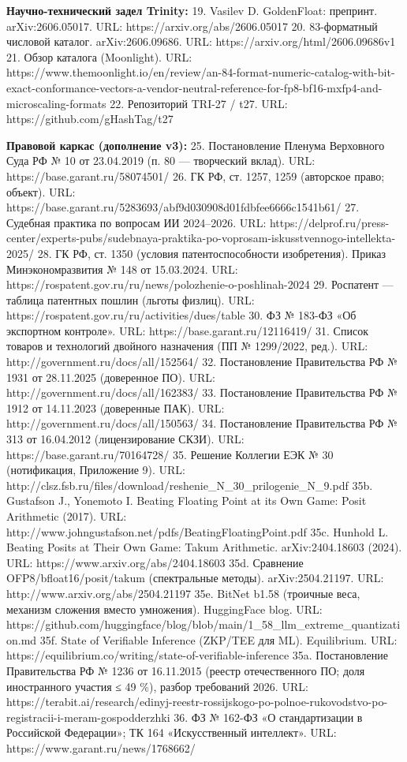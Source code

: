 \documentclass[
  russian,
]{article}
\begin{document}
\textbf{Научно-технический задел Trinity:} 19. Vasilev D. GoldenFloat:
препринт. arXiv:2606.05017. URL: https://arxiv.org/abs/2606.05017 20.
83-форматный числовой каталог. arXiv:2606.09686. URL:
https://arxiv.org/html/2606.09686v1 21. Обзор каталога (Moonlight). URL:
https://www.themoonlight.io/en/review/an-84-format-numeric-catalog-with-bit-exact-conformance-vectors-a-vendor-neutral-reference-for-fp8-bf16-mxfp4-and-microscaling-formats
22. Репозиторий TRI-27 / t27. URL: https://github.com/gHashTag/t27

\textbf{Правовой каркас (дополнение v3):} 25. Постановление Пленума
Верховного Суда РФ № 10 от 23.04.2019 (п. 80 --- творческий вклад). URL:
https://base.garant.ru/58074501/ 26. ГК РФ, ст. 1257, 1259 (авторское
право; объект). URL:
https://base.garant.ru/5283693/abf9d030908d01fdbfee6666c1541b61/ 27.
Судебная практика по вопросам ИИ 2024--2026. URL:
https://delprof.ru/press-center/experts-pubs/sudebnaya-praktika-po-voprosam-iskusstvennogo-intellekta-2025/
28. ГК РФ, ст. 1350 (условия патентоспособности изобретения). Приказ
Минэкономразвития № 148 от 15.03.2024. URL:
https://rospatent.gov.ru/ru/news/polozhenie-o-poshlinah-2024 29.
Роспатент --- таблица патентных пошлин (льготы физлиц). URL:
https://rospatent.gov.ru/ru/activities/dues/table 30. ФЗ № 183-ФЗ «Об
экспортном контроле». URL: https://base.garant.ru/12116419/ 31. Список
товаров и технологий двойного назначения (ПП № 1299/2022, ред.). URL:
http://government.ru/docs/all/152564/ 32. Постановление Правительства РФ
№ 1931 от 28.11.2025 (доверенное ПО). URL:
http://government.ru/docs/all/162383/ 33. Постановление Правительства РФ
№ 1912 от 14.11.2023 (доверенные ПАК). URL:
http://government.ru/docs/all/150563/ 34. Постановление Правительства РФ
№ 313 от 16.04.2012 (лицензирование СКЗИ). URL:
https://base.garant.ru/70164728/ 35. Решение Коллегии ЕЭК № 30
(нотификация, Приложение 9). URL:
http://clsz.fsb.ru/files/download/reshenie\_N\_30\_prilogenie\_N\_9.pdf
35b. Gustafson J., Yonemoto I. Beating Floating Point at its Own Game:
Posit Arithmetic (2017). URL:
http://www.johngustafson.net/pdfs/BeatingFloatingPoint.pdf 35c. Hunhold
L. Beating Posits at Their Own Game: Takum Arithmetic. arXiv:2404.18603
(2024). URL: https://www.arxiv.org/abs/2404.18603 35d. Сравнение
OFP8/bfloat16/posit/takum (спектральные методы). arXiv:2504.21197. URL:
http://www.arxiv.org/abs/2504.21197 35e. BitNet b1.58 (троичные веса,
механизм сложения вместо умножения). HuggingFace blog. URL:
https://github.com/huggingface/blog/blob/main/1\_58\_llm\_extreme\_quantization.md
35f. State of Verifiable Inference (ZKP/TEE для ML). Equilibrium. URL:
https://equilibrium.co/writing/state-of-verifiable-inference 35a.
Постановление Правительства РФ № 1236 от 16.11.2015 (реестр
отечественного ПО; доля иностранного участия ≤ 49 \%), разбор требований
2026. URL:
https://terabit.ai/research/edinyj-reestr-rossijskogo-po-polnoe-rukovodstvo-po-registracii-i-meram-gospodderzhki
36. ФЗ № 162-ФЗ «О стандартизации в Российской Федерации»; ТК 164
«Искусственный интеллект». URL: https://www.garant.ru/news/1768662/
\end{document}
